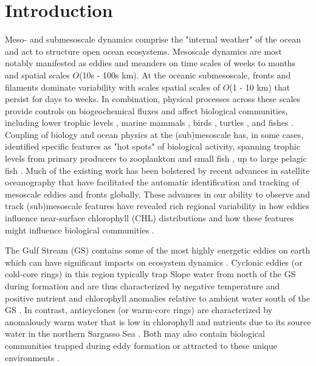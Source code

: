 \clearpage

\section{Introduction}

Meso- and submesoscale dynamics comprise the "internal weather" of the ocean \citep{McGillicuddy2001} and act to structure open ocean ecosystems. Mesoscale dynamics are most notably manifested as eddies and meanders on time scales of weeks to months and spatial scales $O$(10s - 100s km). At the oceanic submesoscale, fronts and filaments dominate variability with scales spatial scales of $O$(1 - 10 km) that persist for days to weeks. In combination, physical processes across these scales provide controls on biogeochemical fluxes \citep{McGillicuddy2016, Mahadevan2016} and affect biological communities, including lower trophic levels \citep{Abraham1998, Martin2003, Labat2009}, marine mammals \citep{Cotte2007, Polovina2006, Bailleul2010, Cotte2015}, birds \citep{Scales2014, TewKai2009}, turtles \citep{Gaube2017, Kobayashi2011, Scales2015}, and fishes \citep{Worm2005, Miller2015, Queiroz2016}. Coupling of biology and ocean physics at the (sub)mesoscale has, in some cases, identified specific features as "hot spots" of biological activity, spanning trophic levels from primary producers \citep{benitez2007mesoscale, Falkowski1991, McGillicuddy2007, Thompson2007} to zooplankton and small fish \citep{godo2012mesoscale}, up to large pelagic fish \citep{Hobday2014, Gaube2018, BraunSwords}. Much of the existing work has been bolstered by recent advances in satellite oceanography that have facilitated the automatic identification and tracking of mesoscale eddies \citep{Chelton2011} and fronts \citep{Belkin2009} globally. These advances in our ability to observe and track (sub)mesoscale features have revealed rich regional variability in how eddies influence near-surface chlorophyll (CHL) distributions \citep{Gaube2014, McGillicuddy2016} and how these features might influence biological communities \citep{Kobayashi2011, Gaube2017, Belkin2014, Queiroz2016, Gaube2018}.

The Gulf Stream (GS) contains some of the most highly energetic eddies on earth \citep{Chelton2011} which can have significant impacts on ecosystem dynamics \citep{Davis1985, Boyd1986, Gaube2018, Gaube2014, Gaube2017DSR}. Cyclonic eddies (or cold-core rings) in this region typically trap Slope water from north of the GS during formation and are thus characterized by negative temperature and positive nutrient and chlorophyll anomalies relative to ambient water south of the GS \citep{Gaube2017DSR, Pingree1979, RingGroup1981}. In contrast, anticyclones (or warm-core rings) are characterized by anomalously warm water that is low in chlorophyll and nutrients due to its source water in the northern Sargasso Sea \citep{Gaube2017DSR, Olson1986}. Both may also contain biological communities trapped during eddy formation \citep{Davis1985, WiebeFlierl1983} or attracted to these unique environments \citep{Hsu2015, Gaube2018}.


